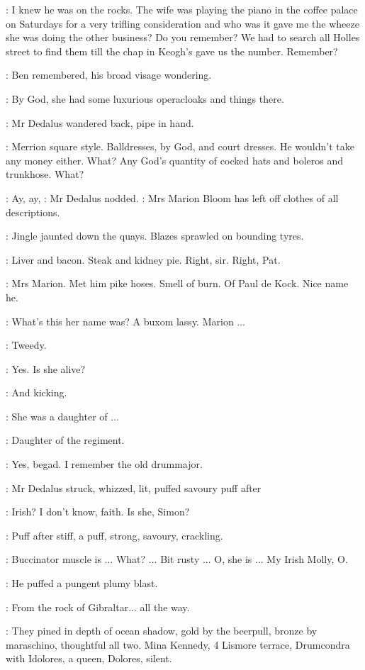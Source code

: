 \cowley:
I knew he was on the rocks. The wife was playing the piano in
the coffee palace on Saturdays for a very trifling consideration and who
was it gave me the wheeze she was doing the other business? Do you
remember? We had to search all Holles street to find them till the chap in
Keogh's gave us the number. Remember?

:
Ben remembered,
his broad visage wondering.

\dollard:
By God, she had some luxurious operacloaks
and things there.

:
Mr Dedalus wandered back, pipe in hand.

\dollard:
Merrion square style. Balldresses, by God, and court dresses. He
wouldn't take any money either. What? Any God's quantity of cocked hats
and boleros and trunkhose. What?

\simon:
Ay, ay,
:
Mr Dedalus nodded.
\simon:
Mrs Marion Bloom has left off clothes of all descriptions.

:
Jingle jaunted down the quays. Blazes sprawled on bounding tyres.

\BloomInt:
Liver and bacon. Steak and kidney pie. Right, sir. Right, Pat.

\BloomInt:
Mrs Marion. Met him pike hoses.
Smell of burn. Of Paul de Kock.
Nice name he.

\dollard:
What's this her name was? A buxom lassy. Marion ...

\simon:
Tweedy.

\dollard:
Yes. Is she alive?

\simon:
And kicking.

\dollard:
She was a daughter of ...

\simon:
Daughter of the regiment.

\dollard:
Yes, begad. I remember the old drummajor.

:
Mr Dedalus struck, whizzed, lit, puffed savoury puff after

\dollard:
Irish? I don't know, faith.
Is she, Simon?

:
Puff after stiff, a puff, strong, savoury, crackling.

\simon:
Buccinator muscle is ... What? ... Bit rusty ... O, she is ... My
Irish Molly, O.

:
He puffed a pungent plumy blast.

\simon:
From the rock of Gibraltar... all the way.

:
They pined in depth of ocean shadow, gold by the beerpull, bronze by
maraschino, thoughtful all two. Mina Kennedy, 4 Lismore terrace,
Drumcondra with Idolores, a queen, Dolores, silent.

